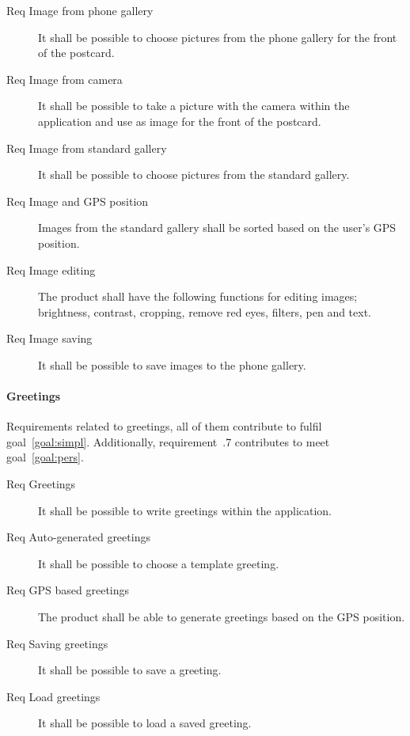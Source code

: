 \documentclass[10pt,a4paper]{article}
\begin{document}
\begin {description}
\item [Req  Image from phone gallery] It shall be possible to choose pictures from the phone gallery for the front of the postcard.
\item [Req  Image from camera] It shall be possible to take a picture with the camera within the application and use as image for the front of the postcard. 
\item [Req  Image from standard gallery] It shall be possible to choose pictures from the standard gallery.
\item [Req  Image and GPS position] Images from the standard gallery shall be sorted based on the user's GPS position.
\item [Req  Image editing] The product shall have the following functions for editing images; brightness, contrast, cropping, remove red eyes, filters, pen and text.
\item [Req  Image saving] It shall be possible to save images to the phone gallery.
\end{description}

\paragraph{Greetings}
Requirements related to greetings, all of them contribute to fulfil goal~\ref{goal:simpl}. Additionally, requirement~\thesubsubsection .7 contributes to meet goal~\ref{goal:pers}.

\begin{description}
	\item [Req  Greetings] It shall be possible to write greetings within the application.
	\item [Req  Auto-generated greetings] It shall be possible to choose a template greeting.
	\item [Req  GPS based greetings] The product shall be able to generate greetings based on the GPS position.
	\item [Req  Saving greetings] It shall be possible to save a greeting.
	\item [Req  Load greetings] It shall be possible to load a saved greeting.
\end{description}
\end{document}
